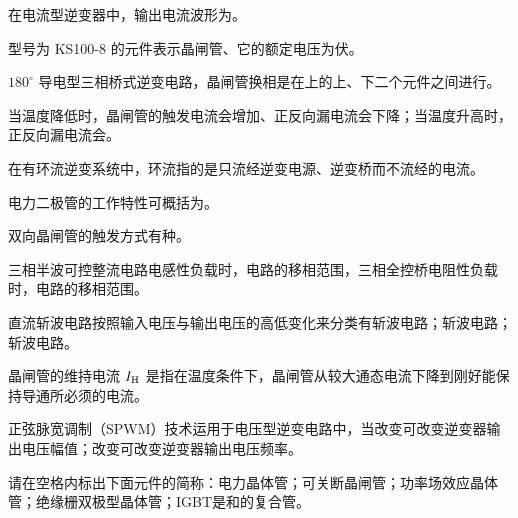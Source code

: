 \documentclass[电力电子]{subfiles}
\begin{document}
\begin{ti}
	在电流型逆变器中，输出电流波形为。
\end{ti}

\begin{ti}
	型号为 KS100-8 的元件表示晶闸管、它的额定电压为伏。
\end{ti}

\begin{ti}
	$180^\circ$ 导电型三相桥式逆变电路，晶闸管换相是在上的上、下二个元件之间进行。
\end{ti}

\begin{ti}
	当温度降低时，晶闸管的触发电流会增加、正反向漏电流会下降；当温度升高时，正反向漏电流会。
\end{ti}

\begin{ti}
	在有环流逆变系统中，环流指的是只流经逆变电源、逆变桥而不流经的电流。
\end{ti}

\begin{ti}
	电力二极管的工作特性可概括为。
\end{ti}

\begin{ti}
	双向晶闸管的触发方式有种。
\end{ti}

\begin{ti}
	三相半波可控整流电路电感性负载时，电路的移相范围，三相全控桥电阻性负载时，电路的移相范围。
\end{ti}

\begin{ti}
	直流斩波电路按照输入电压与输出电压的高低变化来分类有斩波电路；斩波电路；斩波电路。
\end{ti}

\begin{ti}
	晶闸管的维持电流 $I_{\mathrm{H}}$ 是指在温度条件下，晶闸管从较大通态电流下降到刚好能保持导通所必须的电流。
\end{ti}

\begin{ti}
	正弦脉宽调制（SPWM）技术运用于电压型逆变电路中，当改变可改变逆变器输出电压幅值；改变可改变逆变器输出电压频率。
\end{ti}

\begin{ti}
	请在空格内标出下面元件的简称：电力晶体管；可关断晶闸管；功率场效应晶体管；绝缘栅双极型晶体管；IGBT是和的复合管。
\end{ti}
\end{document}
